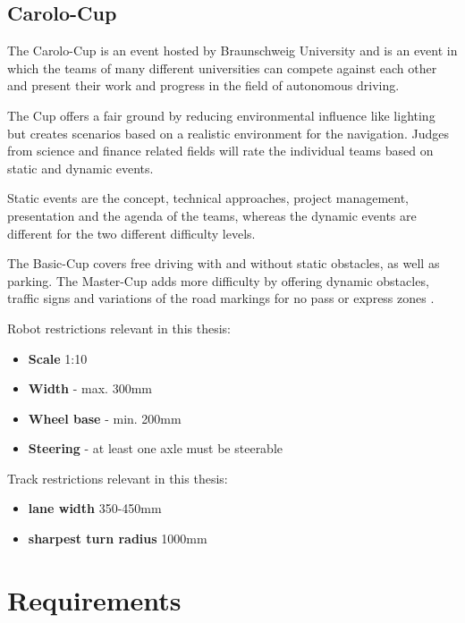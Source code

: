 \section{Carolo-Cup}
The Carolo-Cup is an event hosted by Braunschweig University and is an event in which the teams of many different universities can compete against each other and present their work and progress in the field of autonomous driving.

The Cup offers a fair ground by reducing environmental influence like lighting but creates scenarios based on a realistic environment for the navigation. Judges from science and finance related fields will rate the individual teams based on static and dynamic events.

Static events are the concept, technical approaches, project management, presentation and the agenda of the teams, whereas the dynamic events are different for the two different difficulty levels.

The Basic-Cup covers free driving with and without static obstacles, as well as parking. The Master-Cup adds more difficulty by offering dynamic obstacles, traffic signs and variations of the road markings for no pass or express zones\cite{carolocup} \cite{vdecarolo}.

Robot restrictions relevant in this thesis:
\begin{itemize}
	\item \textbf{Scale} 1:10
	\item \textbf{Width} - max. 300mm
	\item \textbf{Wheel base} - min. 200mm
	\item \textbf{Steering} - at least one axle must be steerable
\end{itemize}

Track restrictions relevant in this thesis:
\begin{itemize}
	\item \textbf{lane width} 350-450mm
	\item \textbf{sharpest turn radius} 1000mm
\end{itemize}











\chapter{Requirements}
\label{requirements}

